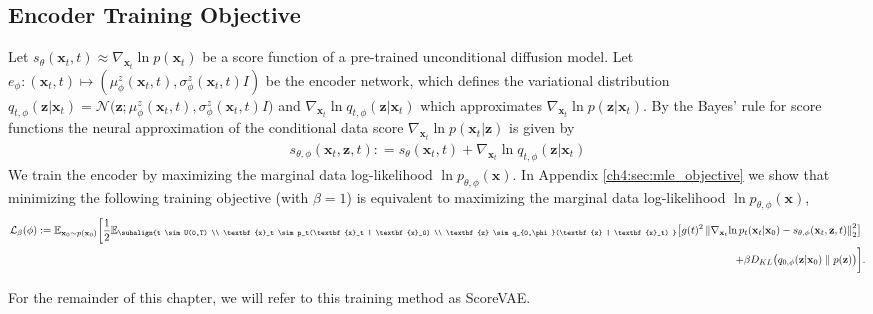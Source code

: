 \subsection{Encoder Training Objective}\label{ch4:Encoder_Training_Objective}
Let $s_\theta(\textbf{x}_t, t) \approx \nabla_{\textbf{x}_t}  \ln{p(\textbf{x}_t)}  $ be a score function of a pre-trained unconditional diffusion model. Let $e_\phi: (\textbf{x}_t, t) \mapsto (\mu_\phi^z(\textbf{x}_t, t), \sigma^z_\phi(\textbf{x}_t, t)I)$ be the encoder network, which defines the variational distribution $q_{t, \phi}(\textbf{z} | \textbf{x}_t) = \mathcal{N}\big( \textbf{z} ; \mu_\phi^z(\textbf{x}_t, t), \sigma^z_\phi(\textbf{x}_t, t)I \big)$ and $\nabla_{\textbf{x}_t} \ln q_{t, \phi}(\textbf{z} | \textbf{x}_t)  $ which approximates $\nabla_{\textbf{x}_t}  \ln{p(\textbf{z} | \textbf{x}_t )}$. By the Bayes' rule for score functions the neural approximation of the conditional data score  $\nabla_{\textbf{x}_t}  \ln{p(\textbf{x}_t | \textbf{z})}$ is given by
\begin{gather*}
s_{\theta, \phi}(\textbf{x}_t, \textbf{z}, t) : = s_\theta(\textbf{x}_t, t) + \nabla_{\textbf{x}_t} \ln q_{t, \phi}(\textbf{z} | \textbf{x}_t)    
\end{gather*}
 We train the encoder by maximizing the marginal data log-likelihood $\ln p_{\theta, \phi}(\textbf{x}) $.
In Appendix \ref{ch4:sec:mle_objective} we show that minimizing the following training objective (with $\beta=1$) is equivalent to maximizing the marginal data log-likelihood $\ln p_{\theta, \phi}(\textbf{x}) $,
\begin{equation*}
\begin{aligned}
    \mathcal{L}_\beta(\phi)  := \mathbb{E}_{\textbf{x}_0 \sim p(\textbf{x}_0)} \bigg[ 
    \frac{1}{2} \mathbb{E}_{\subalign{t \sim U(0,T) \\ \textbf{x}_t \sim p_t(\textbf{x}_t | \textbf{x}_0) \\ \textbf{z} \sim q_{0,\phi}(\textbf{z} | \textbf{x}_t) }} 
    \big[
    g(t)^2  \norm{ \nabla_{\textbf{x}_t}{\ln{p_t(\textbf{x}_t | \textbf{x}_0)}} - s_{\theta, \phi}(\textbf{x}_t, \textbf{z}, t)}_2^2  
    & \big] \\
    + \beta D_{KL}\big( q_{0,\phi}(\textbf{z} | \textbf{x}_0)  \parallel p(\textbf{z})\big)  & \bigg].
\end{aligned}    
\end{equation*}

For the remainder of this chapter, we will refer to this training method as ScoreVAE.

